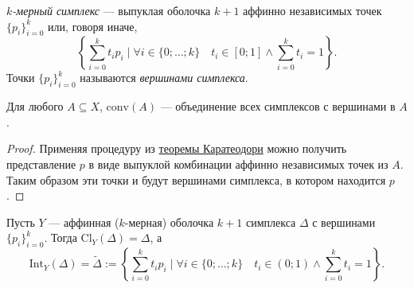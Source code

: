 \documentclass[12pt,a4paper]{article}
\newcommand{\Int}{\ensuremath{\mathrm{Int}}\xspace}
\newcommand{\Cl}{\ensuremath{\mathrm{Cl}}\xspace}
\newcommand{\conv}{\ensuremath{\mathrm{conv}}\xspace}
\begin{document}
    \begin{definition}
        \emph{$k$-мерный симплекс} --- выпуклая оболочка $k+1$ аффинно независимых точек $\{p_i\}_{i=0}^k$ или, говоря иначе,
        \[\left\{\sum_{i=0}^k t_i p_i \mid \forall i \in \{0; \dots; k\} \quad t_i \in [0; 1] \wedge \sum_{i=0}^k t_i = 1 \right\}.\]
        Точки $\{p_i\}_{i=0}^k$ называются \emph{вершинами симплекса}.
    \end{definition}

    \begin{corollary}
        Для любого $A \subseteq X$, $\conv(A)$ --- объединение всех симплексов с вершинами в $A$.
    \end{corollary}

    \begin{proof}
        Применяя процедуру из \hyperref[Caratheodory-theorem]{теоремы Каратеодори} можно получить представление $p$ в виде выпуклой комбинации аффинно независимых точек из $A$. Таким образом эти точки и будут вершинами симплекса, в котором находится $p$.
    \end{proof}

    \begin{lemma}\label{simplex-closure-and-interior-lemma}
        Пусть $Y$ --- аффинная ($k$-мерная) оболочка $k+1$ симплекса $\Delta$ с вершинами $\{p_i\}_{i=0}^k$. Тогда $\Cl_Y(\Delta) = \Delta$, а
        \[\Int_Y(\Delta) = \widetilde{\Delta} := \left\{\sum_{i=0}^k t_i p_i \mid \forall i \in \{0; \dots; k\} \quad t_i \in (0; 1) \wedge \sum_{i=0}^k t_i = 1 \right\}.\]
    \end{lemma}
\end{document}
